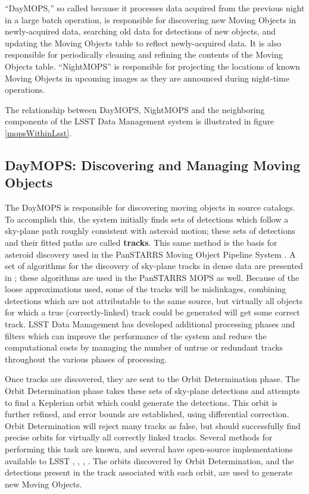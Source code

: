 \documentclass[12pt,preprint]{aastex}
\begin{document}
``DayMOPS,'' so called because it processes data acquired from the
previous night in a large batch operation, is responsible for
discovering new Moving Objects in newly-acquired data, searching old
data for detections of new objects, and updating the Moving Objects
table to reflect newly-acquired data. It is also responsible for
periodically cleaning and refining the contents of the Moving Objects
table.  ``NightMOPS'' is responsible for projecting the locations of known
Moving Objects in upcoming images as they are announced during
night-time operations.  

The relationship between DayMOPS, NightMOPS and the neighboring
components of the LSST Data Management system is illustrated in
figure \ref{mopsWithinLsst}.

\subsection{DayMOPS: Discovering and Managing Moving Objects}



The DayMOPS is responsible for discovering moving objects in source
catalogs.  To accomplish this, the system initially finds sets of
detections which follow a sky-plane path roughly consistent with
asteroid motion; these sets of detections and their fitted paths are
called \textbf{tracks}.  This same method is the basis for asteroid
discovery used in the PanSTARRS Moving Object Pipeline System
\citep{psMOPSDesign}.  A set of algorithms for the discovery of
sky-plane tracks in dense data are presented in
\citet{Kubica:2005:MTA:1081870.1081889}; these algorithms are used in
the PanSTARRS MOPS as well.  Because of the loose approximations used,
some of the tracks will be mislinkages, combining detections which are
not attributable to the same source, but virtually all objects for
which a true (correctly-linked) track could be generated will get some
correct track.  LSST Data Management has developed additional
processing phases and filters which can improve the performance of the
system and reduce the computational costs by managing the number of
untrue or redundant tracks throughout the various phases of
processing.

Once tracks are discovered, they are sent to the Orbit Determination
phase. The Orbit Determination phase takes these sets of sky-plane
detections and attempts to find a Keplerian orbit which could generate
the detections.  This orbit is further refined, and error bounds are
established, using differential correction.  Orbit Determination will
reject many tracks as false, but should successfully find precise
orbits for virtually all correctly linked tracks.  Several methods for
performing this task are known, and several have open-source implementations
available to LSST \citep{Milani04orbitdetermination},
\citep{Milani2006}, \citep{OpenOrb2009}, \citep{granvik_thesis}.  The
orbits discovered by Orbit Determination, and the detections present
in the track associated with each orbit, are used to generate new
Moving Objects.
\end{document}
